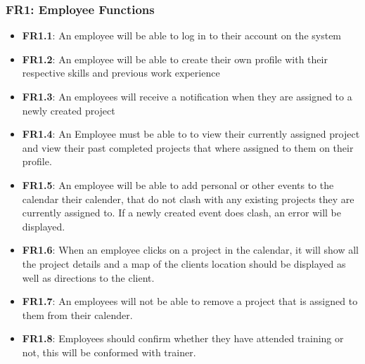 \documentclass[a4paper,12pt]{article}
\begin{document}
	\subsubsection{FR1: Employee Functions}
	\begin{itemize}
		\item \textbf{FR1.1}: An employee will be able to log in to their account on the system
		\item \textbf{FR1.2}: An employee will be able to create their own profile with their        respective skills and previous work experience
		\item \textbf{FR1.3}: An employees will receive a notification when they are assigned to a    newly created project 
		
		\item \textbf{FR1.4}: An Employee must be able to to view their currently assigned           project and view their past completed projects that where assigned        to them on their profile. 
		
		\item \textbf{FR1.5}: An employee will be able to add personal or other events to the        calendar their calender, that do not clash with any existing               projects they are currently assigned to. If a newly created event        does clash, an error will be displayed.  
		
		\item \textbf{FR1.6}: When an employee clicks on a project in the calendar, it will show     all the project details and a map of the clients location should be       displayed as well as directions to the client.
		
		\item \textbf{FR1.7}: An employees will not be able to remove a project that is assigned     to them from their calender.
		
		\item \textbf{FR1.8}: Employees should confirm whether they have attended training or not, this will be conformed with trainer.
	\end{itemize}
	
\end{document}
